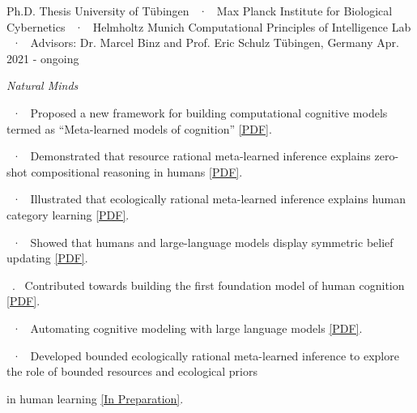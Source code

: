 \begin{cventries}
\vspace{2mm}

    \cventryLab
    {Ph.D. Thesis}
    {University of Tübingen ~·~ Max Planck Institute for Biological Cybernetics  ~·~ Helmholtz Munich} %
    {Computational Principles of Intelligence Lab ~·~ Advisors: Dr. Marcel Binz and Prof. Eric Schulz}%
    {Tübingen, Germany} %
    {Apr. 2021 - ongoing}
    {%
    \begin{cvitems}
    \item \textit{Natural Minds}
     \item ~·~  Proposed a new framework for building computational cognitive models termed as ``Meta-learned models of cognition'' \href{https://arxiv.org/abs/2304.06729}{[PDF]}.
     \item ~·~  Demonstrated that resource rational meta-learned inference explains zero-shot compositional reasoning in humans \href{https://osf.io/preprints/psyarxiv/ymve5}{[PDF]}.
      \item ~·~ Illustrated that ecologically rational meta-learned inference explains human category learning \href{https://arxiv.org/abs/2402.01821}{[PDF]}.
      \item ~·~ Showed that humans and large-language models display symmetric belief updating \href{https://arxiv.org/pdf/2402.01821.pdf}{[PDF]}.
      \item ~.~ Contributed towards building the first foundation model of human cognition \href{https://akjagadish.github.io/assets/Centaur_3_1__a_foundation_model_of_human_cognition.pdf}{[PDF]}.
      \item ~·~ Automating cognitive modeling with large language models \href{https://arxiv.org/pdf/2502.00879.pdf}{[PDF]}.
      \item ~·~ Developed bounded ecologically rational meta-learned inference to explore the role of bounded resources and ecological priors
      \item \phantom{~·~} in human learning \href{}{[In Preparation]}.
      \item \hfill 

\end{cvitems}}
\end{cventries}
